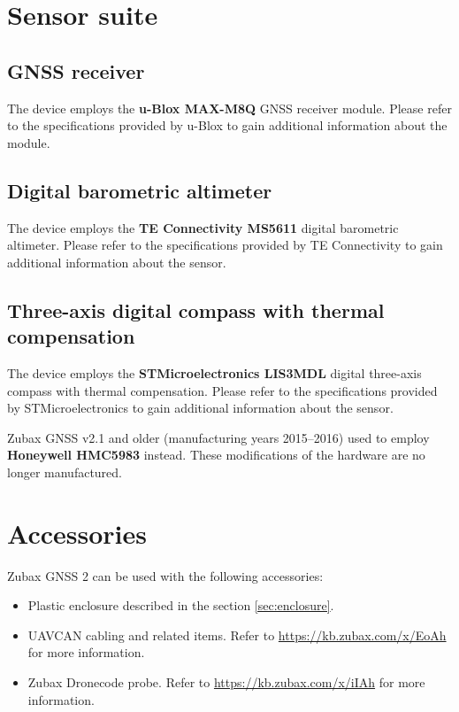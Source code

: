 \documentclass{zubaxdoc}
\begin{document}
\section{Sensor suite}

\subsection{GNSS receiver}

The device employs the \textbf{u-Blox MAX-M8Q} GNSS receiver module.
Please refer to the specifications provided by u-Blox to gain additional information about the module.

\subsection{Digital barometric altimeter}

The device employs the \textbf{TE Connectivity MS5611} digital barometric altimeter.
Please refer to the specifications provided by TE Connectivity to gain additional information about the sensor.

\subsection{Three-axis digital compass with thermal compensation}

The device employs the \textbf{STMicroelectronics LIS3MDL} digital three-axis compass with thermal compensation.
Please refer to the specifications provided by STMicroelectronics to gain additional information about the sensor.

Zubax GNSS v2.1 and older (manufacturing years 2015--2016) used to employ \textbf{Honeywell HMC5983} instead.
These modifications of the hardware are no longer manufactured.

\section{Accessories}

Zubax GNSS 2 can be used with the following accessories:

\begin{itemize}
    \item Plastic enclosure described in the section \ref{sec:enclosure}.
    \item UAVCAN cabling and related items. Refer to \url{https://kb.zubax.com/x/EoAh} for more information.
    \item Zubax Dronecode probe. Refer to \url{https://kb.zubax.com/x/iIAh} for more information.
\end{itemize}
\end{document}
